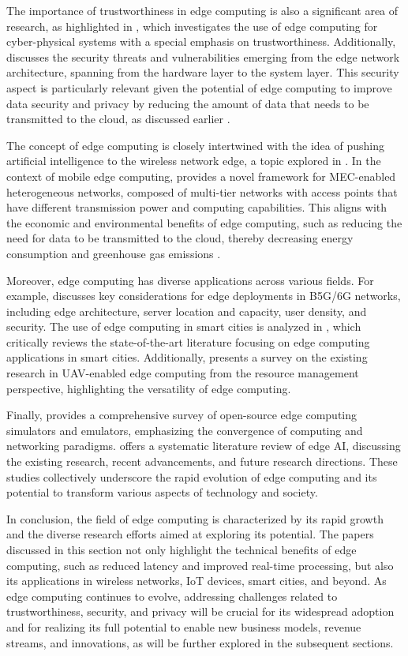 \documentclass[11pt]{article}
\begin{document}
The importance of trustworthiness in edge computing is also a significant area of research, as highlighted in \cite{ref21}, which investigates the use of edge computing for cyber-physical systems with a special emphasis on trustworthiness. Additionally, \cite{ref16} discusses the security threats and vulnerabilities emerging from the edge network architecture, spanning from the hardware layer to the system layer. This security aspect is particularly relevant given the potential of edge computing to improve data security and privacy by reducing the amount of data that needs to be transmitted to the cloud, as discussed earlier \cite{ref16}.

The concept of edge computing is closely intertwined with the idea of pushing artificial intelligence to the wireless network edge, a topic explored in \cite{ref22}. In the context of mobile edge computing, \cite{ref23} provides a novel framework for MEC-enabled heterogeneous networks, composed of multi-tier networks with access points that have different transmission power and computing capabilities. This aligns with the economic and environmental benefits of edge computing, such as reducing the need for data to be transmitted to the cloud, thereby decreasing energy consumption and greenhouse gas emissions \cite{ref1}.

Moreover, edge computing has diverse applications across various fields. For example, \cite{ref24} discusses key considerations for edge deployments in B5G/6G networks, including edge architecture, server location and capacity, user density, and security. The use of edge computing in smart cities is analyzed in \cite{ref25}, which critically reviews the state-of-the-art literature focusing on edge computing applications in smart cities. Additionally, \cite{ref26} presents a survey on the existing research in UAV-enabled edge computing from the resource management perspective, highlighting the versatility of edge computing.

Finally, \cite{ref27} provides a comprehensive survey of open-source edge computing simulators and emulators, emphasizing the convergence of computing and networking paradigms. \cite{ref28} offers a systematic literature review of edge AI, discussing the existing research, recent advancements, and future research directions. These studies collectively underscore the rapid evolution of edge computing and its potential to transform various aspects of technology and society.

In conclusion, the field of edge computing is characterized by its rapid growth and the diverse research efforts aimed at exploring its potential. The papers discussed in this section not only highlight the technical benefits of edge computing, such as reduced latency and improved real-time processing, but also its applications in wireless networks, IoT devices, smart cities, and beyond. As edge computing continues to evolve, addressing challenges related to trustworthiness, security, and privacy will be crucial for its widespread adoption and for realizing its full potential to enable new business models, revenue streams, and innovations, as will be further explored in the subsequent sections.
\end{document}
